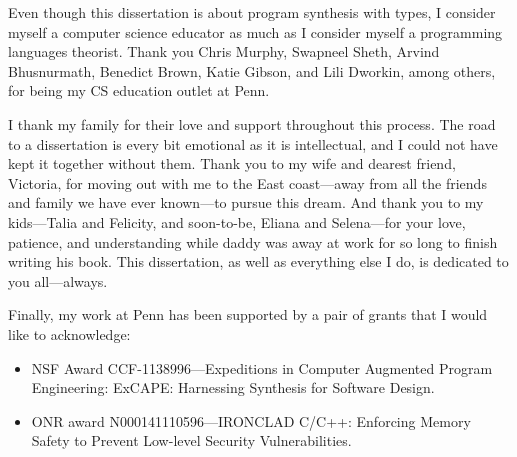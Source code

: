 Even though this dissertation is about program synthesis with types, I consider myself a computer science educator as much as I consider myself a programming languages theorist.
Thank you Chris Murphy, Swapneel Sheth, Arvind Bhusnurmath, Benedict Brown, Katie Gibson, and Lili Dworkin, among others, for being my CS education outlet at Penn.

I thank my family for their love and support throughout this process.
The road to a dissertation is every bit emotional as it is intellectual, and I could not have kept it together without them.
Thank you to my wife and dearest friend, Victoria, for moving out with me to the East coast---away from all the friends and family we have ever known---to pursue this dream.
And thank you to my kids---Talia and Felicity, and soon-to-be, Eliana and Selena---for your love, patience, and understanding while daddy was away at work for so long to finish writing his book.
This dissertation, as well as everything else I do, is dedicated to you all---always.

Finally, my work at Penn has been supported by a pair of grants that I would like to acknowledge:
\begin{itemize}
  \item NSF Award CCF-1138996---Expeditions in Computer Augmented Program Engineering: ExCAPE: Harnessing Synthesis for Software Design.
  \item ONR award N000141110596---IRONCLAD C/C++: Enforcing Memory Safety to Prevent Low-level Security Vulnerabilities.
\end{itemize}

